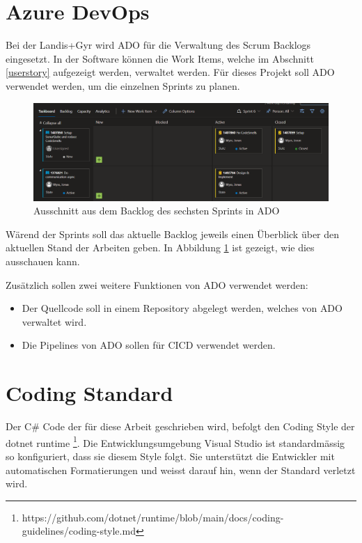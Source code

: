 \section{Azure DevOps}\label{methoden:ADO}
Bei der Landis+Gyr wird \ac{ADO} für die Verwaltung des Scrum Backlogs eingesetzt.
In der Software können die Work Items, welche im Abschnitt \ref{userstory} aufgezeigt werden, verwaltet werden.
Für dieses Projekt soll \ac{ADO} verwendet werden, um die einzelnen Sprints zu planen.
\begin{figure}[H]
   \centering
   \includegraphics[width=1.0\textwidth]{gfx/ado.png}
   \caption{
         Ausschnitt aus dem Backlog des sechsten Sprints in \ac{ADO}
      }
      \label{fig:adosprint6}
\end{figure}
Wärend der Sprints soll das aktuelle Backlog jeweils einen Überblick über den aktuellen Stand der Arbeiten geben.
In Abbildung \ref{fig:adosprint6} ist gezeigt, wie dies ausschauen kann.

Zusätzlich sollen zwei weitere Funktionen von \ac{ADO} verwendet werden:
\begin{itemize}
   \item Der Quellcode soll in einem Repository abgelegt werden, welches von \ac{ADO} verwaltet wird.
   \item Die Pipelines von \ac{ADO} sollen für \ac{CICD} verwendet werden.
\end{itemize}

\section{Coding Standard}\label{codingStandard}
Der C\# Code der für diese Arbeit geschrieben wird, befolgt den Coding Style der dotnet runtime \footnote{https://github.com/dotnet/runtime/blob/main/docs/coding-guidelines/coding-style.md}.
Die Entwicklungsumgebung Visual Studio ist standardmässig so konfiguriert, dass sie diesem Style folgt.
Sie unterstützt die Entwickler mit automatischen Formatierungen und weisst darauf hin, wenn der Standard verletzt wird. 

